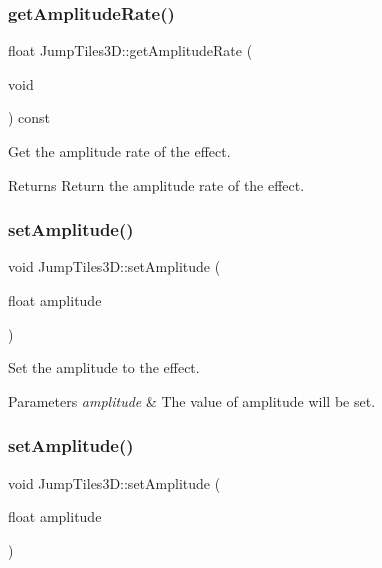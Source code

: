 \subsubsection{\texorpdfstring{get\+Amplitude\+Rate()}{getAmplitudeRate()}\hspace{0.1cm}{\footnotesize\ttfamily [2/2]}}
{\footnotesize\ttfamily float Jump\+Tiles3\+D\+::get\+Amplitude\+Rate (\begin{DoxyParamCaption}\item[{void}]{ }\end{DoxyParamCaption}) const\hspace{0.3cm}{\ttfamily [inline]}}



Get the amplitude rate of the effect. 

\begin{DoxyReturn}{Returns}
Return the amplitude rate of the effect. 
\end{DoxyReturn}
\mbox{\label{classJumpTiles3D_ad8ce4418210315eddafb7d3ed808c456}} 
\subsubsection{\texorpdfstring{set\+Amplitude()}{setAmplitude()}\hspace{0.1cm}{\footnotesize\ttfamily [1/2]}}
{\footnotesize\ttfamily void Jump\+Tiles3\+D\+::set\+Amplitude (\begin{DoxyParamCaption}\item[{float}]{amplitude }\end{DoxyParamCaption})\hspace{0.3cm}{\ttfamily [inline]}}



Set the amplitude to the effect. 


\begin{DoxyParams}{Parameters}
{\em amplitude} & The value of amplitude will be set. \\
\hline
\end{DoxyParams}
\mbox{\label{classJumpTiles3D_ad8ce4418210315eddafb7d3ed808c456}} 
\subsubsection{\texorpdfstring{set\+Amplitude()}{setAmplitude()}\hspace{0.1cm}{\footnotesize\ttfamily [2/2]}}
{\footnotesize\ttfamily void Jump\+Tiles3\+D\+::set\+Amplitude (\begin{DoxyParamCaption}\item[{float}]{amplitude }\end{DoxyParamCaption})\hspace{0.3cm}{\ttfamily [inline]}}



